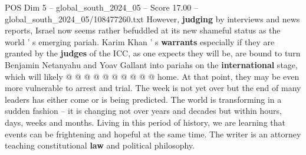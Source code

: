 \begin{textsample}{POS Dim 5 – global\_south\_2024\_05 – Score 17.00 – global\_south\_2024\_05/108477260.txt}
However, \textbf{judging} by interviews and news reports, Israel now seems rather befuddled at its new shameful status as the world ' s emerging pariah.
Karim Khan ' s \textbf{warrants} especially if they are granted by the \textbf{judges} of the ICC, as one expects they will be, are bound to turn Benjamin Netanyahu and Yoav Gallant into pariahs on the \textbf{international} stage, which will likely @ @ @ @ @ @ @ @ @ @ home.
At that point, they may be even more vulnerable to arrest and trial.
The week is not yet over but the end of many leaders has either come or is being predicted.
The world is transforming in a sudden fashion -- it is changing not over years and decades but within hours, days, weeks and months.
Living in this period of history, we are learning that events can be frightening and hopeful at the same time.
The writer is an attorney teaching constitutional \textbf{law} and political philosophy.

\end{textsample}
